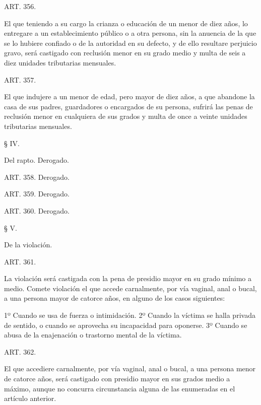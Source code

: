     ART. 356.

    El que teniendo a su cargo la crianza o educación de un menor de diez años, lo entregare a un establecimiento público o a otra persona, sin la anuencia de la que se lo hubiere confiado o de la autoridad en su defecto, y de ello resultare perjuicio gravo, será castigado con reclusión menor en su grado medio y multa de seis a diez unidades tributarias mensuales.









    ART. 357.

    El que indujere a un menor de edad, pero mayor de diez años, a que abandone la casa de sus padres, guardadores o encargados de su persona, sufrirá las penas de reclusión menor en cualquiera de sus grados y multa de once a veinte unidades tributarias mensuales.








    § IV.

    Del rapto. Derogado.




    ART. 358.    Derogado.

    ART. 359.    Derogado.

    ART. 360.    Derogado.



    § V.

    De la violación.




    ART. 361.

    La violación será castigada con la pena de presidio mayor en su grado mínimo a medio.
    Comete violación el que accede carnalmente, por vía vaginal, anal o bucal, a una persona mayor de catorce años, en alguno de los casos siguientes:

    1º Cuando se usa de fuerza o intimidación.
    2º Cuando la víctima se halla privada de sentido, o cuando se aprovecha su incapacidad para oponerse.
    3º Cuando se abusa de la enajenación o trastorno mental de la víctima.

    ART. 362.

    El que accediere carnalmente, por vía vaginal, anal o bucal, a una persona menor de catorce años, será castigado con presidio mayor en sus grados medio a máximo, aunque no concurra circunstancia alguna de las enumeradas en el artículo anterior.

